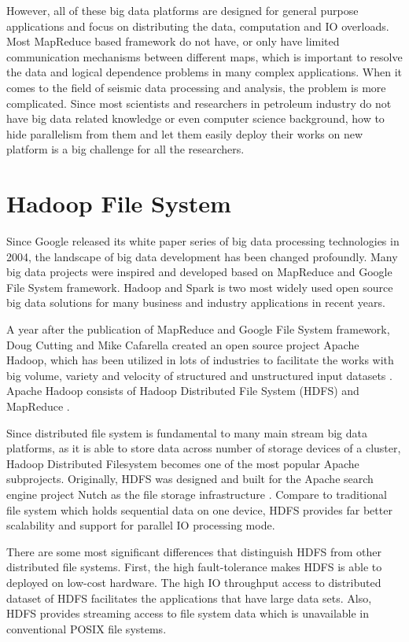 However, all of these big data platforms are designed for general purpose applications and focus on distributing the data, computation and IO overloads. Most MapReduce based framework do not have, or only have limited communication mechanisms between different maps, which is important to resolve the data and logical dependence problems in many complex applications. When it comes to the field of  seismic data processing and analysis, the problem is more complicated. Since most scientists and researchers in petroleum industry do not have big data related knowledge or even computer science background, how to hide parallelism from them and let them easily deploy their works on new platform is a big challenge for all the researchers.

\section{Hadoop File System}

Since Google released its white paper series of big data processing technologies in 2004, the landscape of big data development has been changed profoundly. Many big data projects were inspired and developed based on MapReduce and Google File System framework. Hadoop and Spark is two most widely used open source big data solutions for many business and industry applications in recent years. 

A year after the publication of MapReduce and Google File System framework, Doug Cutting and Mike Cafarella created an open source project Apache Hadoop, which has been utilized in lots of industries to facilitate the works with big volume, variety and velocity of structured and unstructured input datasets \cite{bigdatahistory}. Apache Hadoop consists of Hadoop Distributed File System (HDFS) and MapReduce \cite{ApacheHadoop}.  

Since distributed file system is fundamental to many main stream big data platforms, as it is able to store data across number of storage devices of a cluster, Hadoop Distributed Filesystem becomes one of the most popular Apache subprojects. Originally, HDFS was designed and built for the Apache search engine project Nutch as the file storage infrastructure \cite{ApacheHadoop}. Compare to traditional file system which holds sequential data on one device, HDFS provides far better scalability and support for parallel IO processing mode.

There are some most significant differences that distinguish HDFS from other distributed file systems. First, the high fault-tolerance makes HDFS is able to deployed on low-cost hardware. The high IO throughput access to distributed dataset of HDFS facilitates the applications that have large data sets. Also, HDFS provides streaming access to file system data which is unavailable in conventional POSIX file systems.  

